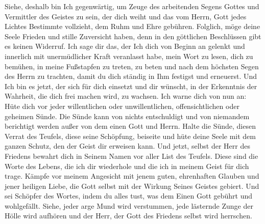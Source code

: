  Siehe, deshalb bin Ich gegenwärtig, um Zeuge des arbeitenden Segens Gottes und Vermittler des Geistes zu sein, der dich weiht und das vom Herrn, Gott jedes Lichtes Bestimmte vollzieht, dem Ruhm und Ehre gebühren. Folglich, möge deine Seele Frieden und stille Zuversicht haben, denn in den göttlichen Beschlüssen gibt es keinen Widerruf. Ich sage dir das, der Ich dich von Beginn an gelenkt und innerlich mit unermüdlicher Kraft veranlasst habe, mein Wort zu lesen, dich zu bemühen, in meine Fußstapfen zu treten, zu beten und nach dem höchsten Segen des Herrn zu trachten, damit du dich ständig in Ihm festigst und erneuerst. Und Ich bin es jetzt, der sich für dich einsetzt und dir wünscht, in der Erkenntnis der Wahrheit, die dich frei machen wird, zu wachsen. Ich warne dich von nun an: Hüte dich vor jeder willentlichen oder unwillentlichen, offensichtlichen oder geheimen Sünde. Die Sünde kann von nichts entschuldigt und von niemandem berichtigt werden außer von dem einen Gott und Herrn. Halte die Sünde, diesen Verrat des Teufels, diese seine Schöpfung, beiseite und hüte deine Seele mit dem ganzen Schutz, den der Geist dir erweisen kann. Und jetzt, selbst der Herr des Friedens bewahrt dich in Seinem Namen vor aller List des Teufels. Diese sind die Worte des Lebens, die ich dir wiederhole und die ich in meinem Geist für dich trage. Kämpfe vor meinem Angesicht mit jenem guten, ehrenhaften Glauben und jener heiligen Liebe, die Gott selbst mit der Wirkung Seines Geistes gebiert. Und sei Schöpfer des Wortes, indem du alles tust, was dem Einen Gott gebührt und wohlgefällt. Siehe, jeder arge Mund wird verstummen, jede lästernde Zunge der Hölle wird aufhören und der Herr, der Gott des Friedens selbst wird herrschen.
 
